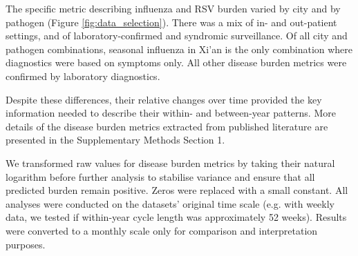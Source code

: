 The specific metric describing influenza and RSV burden varied by city and by pathogen (Figure \ref{fig:data_selection}).
There was a mix of in- and out-patient settings, and of laboratory-confirmed and syndromic surveillance.
Of all city and pathogen combinations, seasonal influenza in Xi'an is the only combination where diagnostics were based on symptoms only.
All other disease burden metrics were confirmed by laboratory diagnostics.

Despite these differences, their relative changes over time provided the key information needed to describe their within- and between-year patterns.
More details of the disease burden metrics extracted from published literature are presented in the Supplementary Methods Section 1.

We transformed raw values for disease burden metrics by taking their natural logarithm before further analysis to stabilise variance and ensure that all predicted burden remain positive.
Zeros were replaced with a small constant.
All analyses were conducted on the datasets' original time scale (e.g. with weekly data, we tested if within-year cycle length was approximately 52 weeks).
Results were converted to a monthly scale only for comparison and interpretation purposes.




